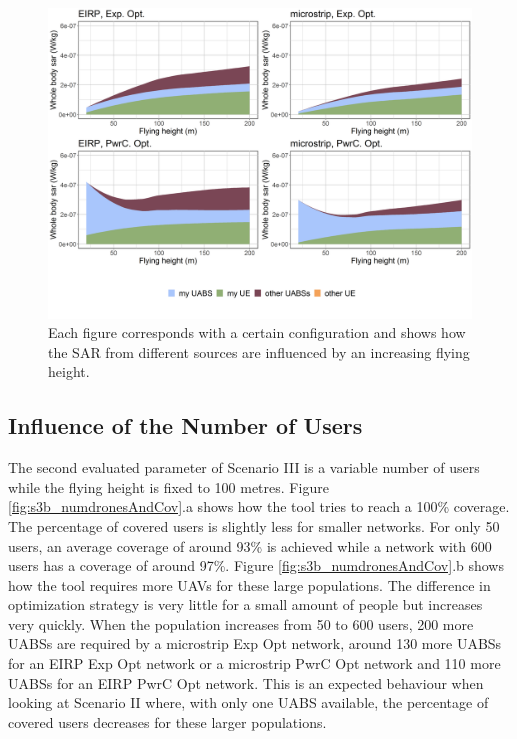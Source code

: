 \begin{figure}[h!]
\centering
  \includegraphics[width=\textwidth]{../results/s3/fhFourSources.png}
  \caption{
  Each figure corresponds with a certain configuration and shows how the \acs{SAR} from different sources are influenced by an increasing flying height.}  
  \label{fig:s3a_fourSourcesMatrix}
\end{figure}

\FloatBarrier
\subsection{Influence of the Number of Users}
\label{S3B}
The second evaluated parameter of Scenario III is a variable number of users while the flying height is fixed to 100 metres.  
Figure \ref{fig:s3b_numdronesAndCov}.a shows how the tool tries to reach a 100\% coverage. The percentage
of covered users is slightly less for smaller networks. For only 50 users, an average 
coverage of around 93\% is achieved while a network with 600 users has a coverage of around 97\%.
Figure \ref{fig:s3b_numdronesAndCov}.b shows how the tool requires more \gls{UAV}s for these large 
populations. 
The difference in optimization strategy is very little for a small amount of people but increases very quickly. 
When the population increases from 50 to 600 users,
 200 more \gls{UABS}s are required by a microstrip \gls{Exp Opt} network, 
 around 130 more \gls{UABS}s for an \gls{EIRP} \gls{Exp Opt} network or a microstrip \gls{PwrC Opt} network
 and 110 more \gls{UABS}s for an \gls{EIRP} \gls{PwrC Opt} network.
This is an expected behaviour  when looking at Scenario II where, with only one \gls{UABS} available, 
the percentage of covered users decreases for these larger populations.

